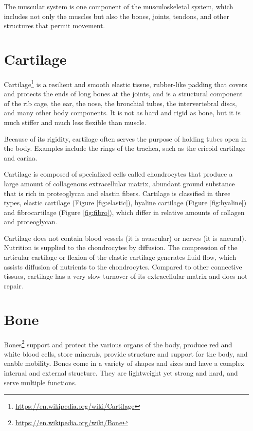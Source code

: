 \documentclass[]{book}
\let\rmarkdownfootnote\footnote%
\def\footnote{\protect\rmarkdownfootnote}
\renewcommand{\href}[2]{#2\footnote{\url{#1}}}
\theoremstyle{definition}
\theoremstyle{definition}
\theoremstyle{definition}
\theoremstyle{remark}
\begin{document}
The muscular system is one component of the musculoskeletal system,
which includes not only the muscles but also the bones, joints, tendons,
and other structures that permit movement.

\section{Cartilage}\label{cartilage}

\href{https://en.wikipedia.org/wiki/Cartilage}{Cartilage} is a resilient
and smooth elastic tissue, rubber-like padding that covers and protects
the ends of long bones at the joints, and is a structural component of
the rib cage, the ear, the nose, the bronchial tubes, the intervertebral
discs, and many other body components. It is not as hard and rigid as
bone, but it is much stiffer and much less flexible than muscle.

Because of its rigidity, cartilage often serves the purpose of holding
tubes open in the body. Examples include the rings of the trachea, such
as the cricoid cartilage and carina.

Cartilage is composed of specialized cells called chondrocytes that
produce a large amount of collagenous extracellular matrix, abundant
ground substance that is rich in proteoglycan and elastin fibers.
Cartilage is classified in three types, elastic cartilage (Figure
\ref{fig:elastic}), hyaline cartilage (Figure \ref{fig:hyaline}) and
fibrocartilage (Figure \ref{fig:fibro}), which differ in relative
amounts of collagen and proteoglycan.

Cartilage does not contain blood vessels (it is avascular) or nerves (it
is aneural). Nutrition is supplied to the chondrocytes by diffusion. The
compression of the articular cartilage or flexion of the elastic
cartilage generates fluid flow, which assists diffusion of nutrients to
the chondrocytes. Compared to other connective tissues, cartilage has a
very slow turnover of its extracellular matrix and does not repair.

\section{Bone}\label{bone}

\href{https://en.wikipedia.org/wiki/Bone}{Bones} support and protect the
various organs of the body, produce red and white blood cells, store
minerals, provide structure and support for the body, and enable
mobility. Bones come in a variety of shapes and sizes and have a complex
internal and external structure. They are lightweight yet strong and
hard, and serve multiple functions.
\end{document}
